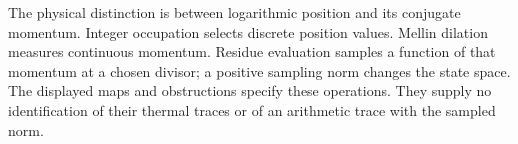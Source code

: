 The physical distinction is between logarithmic position and its
conjugate momentum. Integer occupation selects discrete position
values. Mellin dilation measures continuous momentum. Residue
evaluation samples a function of that momentum at a chosen divisor;
a positive sampling norm changes the state space. The displayed
maps and obstructions specify these operations. They supply no
identification of their thermal traces or of an arithmetic trace
with the sampled norm.

